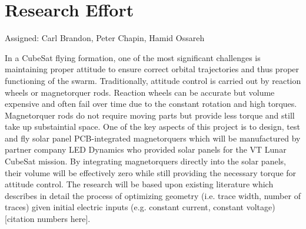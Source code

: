 \section{Research Effort}
Assigned: Carl Brandon, Peter Chapin, Hamid Ossareh

In a CubeSat flying formation, one of the most significant challenges is maintaining proper attitude to ensure correct orbital trajectories and thus proper functioning of the swarm. Traditionally, attitude control is carried out by reaction wheels or magnetorquer rods. Reaction wheels can be accurate but volume expensive and often fail over time due to the constant rotation and high torques. Magnetorquer rods do not require moving parts but provide less torque and still take up substaintial space. One of the key aspects of this project is to design, test and fly solar panel PCB-integrated magnetorquers which will be manufactured by partner company LED Dynamics who provided solar panels for the VT Lunar CubeSat mission. By integrating magnetorquers directly into the solar panels, their volume will be effectively zero while still providing the necessary torque for attitude control. The research will be based upon existing literature which describes in detail the process of optimizing geometry (i.e. trace width, number of traces) given initial electric inputs (e.g. constant current, constant voltage)[citation numbers here].

